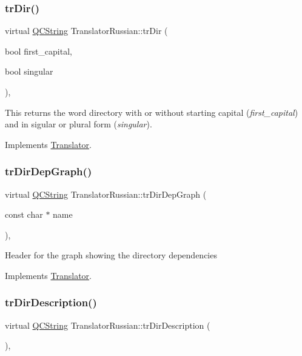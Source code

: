 \subsubsection{\texorpdfstring{trDir()}{trDir()}}
{\footnotesize\ttfamily virtual \mbox{\hyperlink{class_q_c_string}{Q\+C\+String}} Translator\+Russian\+::tr\+Dir (\begin{DoxyParamCaption}\item[{bool}]{first\+\_\+capital,  }\item[{bool}]{singular }\end{DoxyParamCaption})\hspace{0.3cm}{\ttfamily [inline]}, {\ttfamily [virtual]}}

This returns the word directory with or without starting capital ({\itshape first\+\_\+capital}) and in sigular or plural form ({\itshape singular}). 

Implements \mbox{\hyperlink{class_translator}{Translator}}.

\mbox{\label{class_translator_russian_accd35bbc02411be66151aa0ea4370591}} 
\subsubsection{\texorpdfstring{trDirDepGraph()}{trDirDepGraph()}}
{\footnotesize\ttfamily virtual \mbox{\hyperlink{class_q_c_string}{Q\+C\+String}} Translator\+Russian\+::tr\+Dir\+Dep\+Graph (\begin{DoxyParamCaption}\item[{const char $\ast$}]{name }\end{DoxyParamCaption})\hspace{0.3cm}{\ttfamily [inline]}, {\ttfamily [virtual]}}

Header for the graph showing the directory dependencies 

Implements \mbox{\hyperlink{class_translator}{Translator}}.

\mbox{\label{class_translator_russian_af35fddb66dbf373514c10b39d6276889}} 
\subsubsection{\texorpdfstring{trDirDescription()}{trDirDescription()}}
{\footnotesize\ttfamily virtual \mbox{\hyperlink{class_q_c_string}{Q\+C\+String}} Translator\+Russian\+::tr\+Dir\+Description (\begin{DoxyParamCaption}{ }\end{DoxyParamCaption})\hspace{0.3cm}{\ttfamily [inline]}, {\ttfamily [virtual]}}

